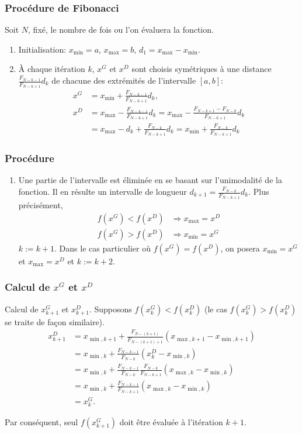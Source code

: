 \documentclass[usepdftitle=false]{beamer}
\begin{document}
\begin{frame}
\frametitle{Procédure de Fibonacci}

Soit $N$, fixé, le nombre de fois ou l'on évaluera la fonction.

\begin{enumerate}
\item
Initialisation: $x_{\min} = a$, $x_{\max} = b$, $d_1 = x_{\max}-x_{\min}$.
\item 
À chaque itération $k$, $x^G$ et $x^D$ sont choisis symétriques à une distance $\frac{F_{N-k-1}}{F_{N-k+1}}d_k$ de chacune des extrémités de l’intervalle $[a,b]$:
\begin{align*}
x^G &= x_{\min}+\frac{F_{N-k-1}}{F_{N-k+1}}d_k,\\
x^D &= x_{\max}-\frac{F_{N-k-1}}{F_{N-k+1}}d_k= x_{\max}-\frac{F_{N-k+1}-F_{N-k}}{F_{N-k+1}}d_k \\
& = x_{\max}-d_k+\frac{F_{N-k}}{F_{N-k+1}}d_k = x_{\min}+\frac{F_{N-k}}{F_{N-k+1}}d_k
\end{align*}
\end{enumerate}

\end{frame}

\begin{frame}
\frametitle{Procédure}

\begin{enumerate}[2]
\item
Une partie de l'intervalle est éliminée en se basant sur l’unimodalité de la fonction.
Il en résulte un intervalle de longueur $d_{k+1} = \frac{F_{N-k}}{F_{N-k+1}}d_k$.
Plus précisément,
\begin{align*}
f(x^G) < f(x^D) & \Rightarrow x_{\max} = x^D \\
f(x^G) > f(x^D) & \Rightarrow x_{\min} = x^G
\end{align*}
$k := k+1$.
Dans le cas particulier où $f(x^G) = f(x^D)$, on posera $x_{\min} = x^G$ et $x_{\max} = x^D$ et $k := k+2$.
\end{enumerate}

\end{frame}

\begin{frame}
\frametitle{Calcul de $x^G$ et $x^D$}

Calcul de $x^G_{k+1}$ et $x^D_{k+1}$.
Supposons $f(x^G_k) < f(x^D_k)$ (le cas $f(x^G_k) > f(x^D_k)$ se traite de façon similaire).
\begin{align*}
x^D_{k+1}
& = x_{\min, k+1} + \frac{F_{N-(k+1)}}{F_{N-(k+1)+1}}(x_{\max, k+1}-x_{\min, k+1}) \\
& = x_{\min, k} + \frac{F_{N-k-1}}{F_{N-k}}(x^D_k-x_{\min, k}) \\
& = x_{\min, k} + \frac{F_{N-k-1}}{F_{N-k}}\frac{F_{N-k}}{F_{N-k+1}}(x_{\max,k}-x_{\min, k}) \\
& = x_{\min, k} + \frac{F_{N-k-1}}{F_{N-k+1}}(x_{\max, k}-x_{\min, k}) \\
& = x^G_k.
\end{align*}

Par conséquent, seul $f(x^G_{k+1})$ doit être évaluée à l'itération $k+1$.

\end{frame}
\end{document}
